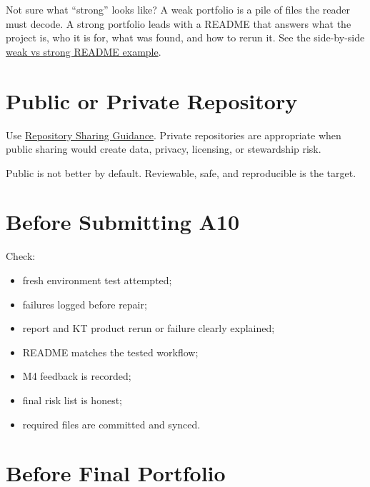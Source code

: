 \documentclass[
  letterpaper,
  DIV=11,
  numbers=noendperiod,
  oneside]{scrreprt}
\providecommand{\tightlist}{%
  \setlength{\itemsep}{0pt}\setlength{\parskip}{0pt}}
\begin{document}
Not sure what ``strong'' looks like? A weak portfolio is a pile of files
the reader must decode. A strong portfolio leads with a README that
answers what the project is, who it is for, what was found, and how to
rerun it. See the side-by-side
\hyperref[weak-vs-strong-a-readme-example]{weak vs strong README
example}.

\section*{Public or Private
Repository}\label{public-or-private-repository}


Use
\href{../../milestones/final-portfolio/repository-sharing-guidance.md}{Repository
Sharing Guidance}. Private repositories are appropriate when public
sharing would create data, privacy, licensing, or stewardship risk.

Public is not better by default. Reviewable, safe, and reproducible is
the target.

\section*{Before Submitting A10}\label{before-submitting-a10}


Check:

\begin{itemize}
\tightlist
\item
  fresh environment test attempted;
\item
  failures logged before repair;
\item
  report and KT product rerun or failure clearly explained;
\item
  README matches the tested workflow;
\item
  M4 feedback is recorded;
\item
  final risk list is honest;
\item
  required files are committed and synced.
\end{itemize}

\section*{Before Final Portfolio}\label{before-final-portfolio}
\end{document}

